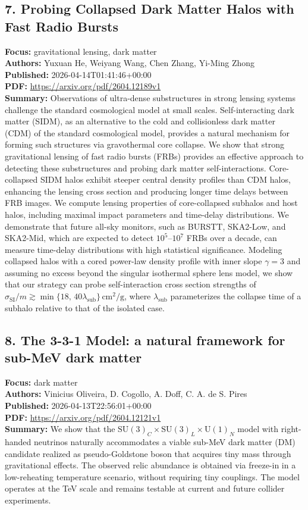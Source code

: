 \documentclass[11pt]{article}
\begin{document}
\subsection*{7. Probing Collapsed Dark Matter Halos with Fast Radio Bursts}
\textbf{Focus:} gravitational lensing, dark matter\\
\textbf{Authors:} Yuxuan He, Weiyang Wang, Chen Zhang, Yi-Ming Zhong\\
\textbf{Published:} 2026-04-14T01:41:46+00:00\\
\textbf{PDF:} \href{https://arxiv.org/pdf/2604.12189v1}{https://arxiv.org/pdf/2604.12189v1}\\
\textbf{Summary:}
Observations of ultra-dense substructures in strong lensing systems challenge the standard cosmological model at small scales. Self-interacting dark matter (SIDM), as an alternative to the cold and collisionless dark matter (CDM) of the standard cosmological model, provides a natural mechanism for forming such structures via gravothermal core collapse. We show that strong gravitational lensing of fast radio bursts (FRBs) provides an effective approach to detecting these substructures and probing dark matter self-interactions. Core-collapsed SIDM halos exhibit steeper central density profiles than CDM halos, enhancing the lensing cross section and producing longer time delays between FRB images. We compute lensing properties of core-collapsed subhalos and host halos, including maximal impact parameters and time-delay distributions. We demonstrate that future all-sky monitors, such as BURSTT, SKA2-Low, and SKA2-Mid, which are expected to detect $10^{5}$--$10^{7}$ FRBs over a decade, can measure time-delay distributions with high statistical significance. Modeling collapsed halos with a cored power-law density profile with inner slope $\gamma =3$ and assuming no excess beyond the singular isothermal sphere lens model, we show that our strategy can probe self-interaction cross section strengths of $\sigma _{\text{SI}}/m \gtrsim \min\{18,\, 40\lambda _{\text{sub}}\}\,\text{cm}^2/\text{g}$, where $\lambda _{\text{sub}}$ parameterizes the collapse time of a subhalo relative to that of the isolated case.
\newpage
\subsection*{8. The 3-3-1 Model: a natural framework for sub-MeV dark matter}
\textbf{Focus:} dark matter\\
\textbf{Authors:} Vinicius Oliveira, D. Cogollo, A. Doff, C. A. de S. Pires\\
\textbf{Published:} 2026-04-13T22:56:01+00:00\\
\textbf{PDF:} \href{https://arxiv.org/pdf/2604.12121v1}{https://arxiv.org/pdf/2604.12121v1}\\
\textbf{Summary:}
We show that the $\mathrm{SU}(3)_C \times \mathrm{SU}(3)_L \times \mathrm{U}(1)_N$ model with right-handed neutrinos naturally accommodates a viable sub-MeV dark matter (DM) candidate realized as pseudo-Goldstone boson that acquires tiny mass through gravitational effects. The observed relic abundance is obtained via freeze-in in a low-reheating temperature scenario, without requiring tiny couplings. The model operates at the TeV scale and remains testable at current and future collider experiments.
\newpage
\end{document}
